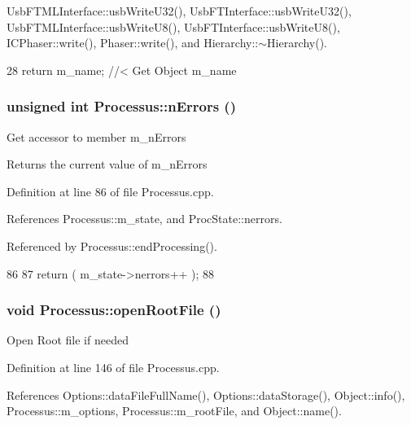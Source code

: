 UsbFTMLInterface::usbWriteU32(), UsbFTInterface::usbWriteU32(), UsbFTMLInterface::usbWriteU8(), UsbFTInterface::usbWriteU8(), ICPhaser::write(), Phaser::write(), and Hierarchy::$\sim$Hierarchy().


\begin{DoxyCode}
28 { return m_name; } //< Get Object m_name
\end{DoxyCode}
\hypertarget{classProcessus_a82a0487f82f07cc2c2dc2731f98149e7}{
\subsubsection[{nErrors}]{\setlength{\rightskip}{0pt plus 5cm}unsigned int Processus::nErrors ()}}
\label{classProcessus_a82a0487f82f07cc2c2dc2731f98149e7}
Get accessor to member m\_\-nErrors \begin{DoxyReturn}{Returns}
the current value of m\_\-nErrors 
\end{DoxyReturn}


Definition at line 86 of file Processus.cpp.

References Processus::m\_\-state, and ProcState::nerrors.

Referenced by Processus::endProcessing().


\begin{DoxyCode}
86                                 {
87   return ( m_state->nerrors++ );
88 }
\end{DoxyCode}
\hypertarget{classProcessus_aacf6812880c1d1a2bf14a4a39458f443}{
\subsubsection[{openRootFile}]{\setlength{\rightskip}{0pt plus 5cm}void Processus::openRootFile ()}}
\label{classProcessus_aacf6812880c1d1a2bf14a4a39458f443}
Open Root file if needed 

Definition at line 146 of file Processus.cpp.

References Options::dataFileFullName(), Options::dataStorage(), Object::info(), Processus::m\_\-options, Processus::m\_\-rootFile, and Object::name().

